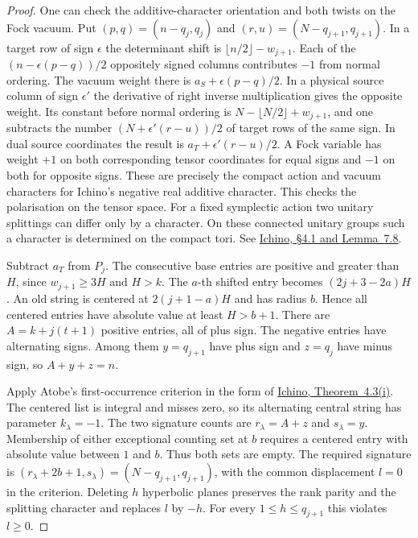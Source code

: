 \documentclass[a4paper,11pt]{article}
\theoremstyle{definition}
\theoremstyle{remark}
\numberwithin{equation}{section}
\begin{document}
\begin{proof}
One can check the additive-character orientation and both twists
on the Fock vacuum. Put \((p,q)=(n-q_j,q_j)\) and
\((r,u)=(N-q_{j+1},q_{j+1})\). In a target row of sign \(\epsilon\)
the determinant shift is \(\lfloor n/2\rfloor-w_{j+1}\).
Each of the \((n-\epsilon(p-q))/2\) oppositely signed columns
contributes \(-1\) from normal ordering. The vacuum weight there
is \(a_S+\epsilon(p-q)/2\). In a physical source column of sign
\(\epsilon'\) the derivative of right inverse multiplication gives
the opposite weight. Its constant before normal ordering is
\(N-\lfloor N/2\rfloor+w_{j+1}\), and one subtracts the number
\((N+\epsilon'(r-u))/2\) of target rows of the same sign.
In dual source coordinates the result is
\(a_T+\epsilon'(r-u)/2\). A Fock variable has weight \(+1\) on
both corresponding tensor coordinates for equal signs and \(-1\)
on both for opposite signs. These are precisely the compact
action and vacuum characters for Ichino's negative real additive
character. This checks the polarisation on the tensor space.
For a fixed symplectic action two unitary splittings can differ
only by a character. On these connected unitary groups such a
character is determined on the compact tori. See
\href{https://arxiv.org/pdf/2002.09148}{Ichino,
\S4.1 and Lemma~7.8}.

Subtract \(a_T\) from \(P_j\). The consecutive base entries are
positive and greater than \(H\), since \(w_{j+1}\geq 3H\) and
\(H>k\). The \(a\)-th shifted entry becomes
\((2j+3-2a)H\). An old string is centered at \(2(j+1-a)H\)
and has radius \(b\). Hence all centered entries have absolute
value at least \(H>b+1\). There are \(A=k+j(t+1)\) positive
entries, all of plus sign. The negative entries have alternating
signs. Among them \(y=q_{j+1}\) have plus sign and \(z=q_j\)
have minus sign, so \(A+y+z=n\).

Apply Atobe's first-occurrence criterion in the form of
\href{https://arxiv.org/pdf/2002.09148}{Ichino, Theorem~4.3(i)}.
The centered list is integral and misses zero, so its alternating
central string has parameter \(k_\lambda=-1\).
The two signature counts are \(r_\lambda=A+z\) and
\(s_\lambda=y\). Membership of either exceptional counting set
at \(b\) requires a centered entry with absolute value between
\(1\) and \(b\). Thus both sets are empty. The required signature
is \((r_\lambda+2b+1,s_\lambda)=(N-q_{j+1},q_{j+1})\),
with the common displacement \(l=0\) in the criterion.
Deleting \(h\) hyperbolic planes preserves the rank parity and
the splitting character and replaces \(l\) by \(-h\). For every
\(1\leq h\leq q_{j+1}\) this violates \(l\geq0\).


\end{proof}
\end{document}
